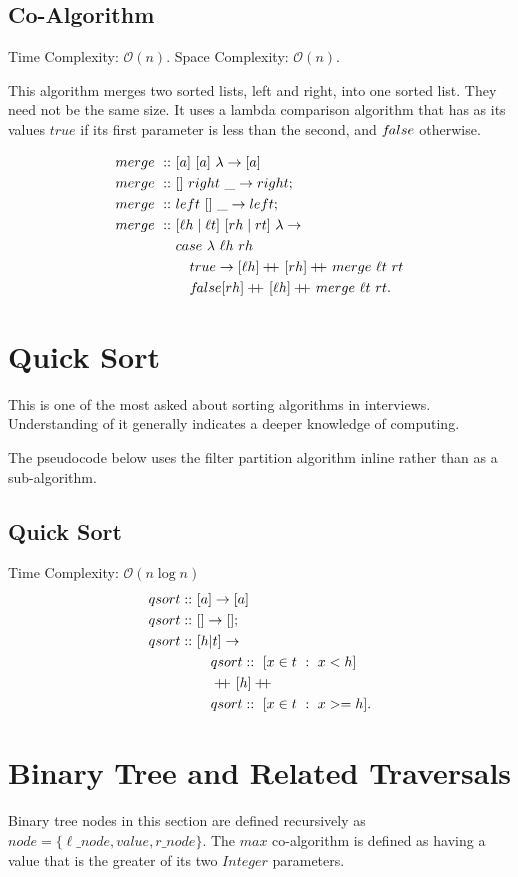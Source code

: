 \documentclass[a4paper,10pt]{book}
\newcommand\doubleplus{+\kern-1.3ex+\kern0.8ex}
\newcommand{\false}{f\kern-0.25ex{alse}}
\begin{document}
\subsection{Co-Algorithm} Time Complexity: $\mathcal{O}(n)$. Space Complexity: $\mathcal{O}(n)$.

This algorithm merges two sorted lists, left and right, into one sorted list. They need not be the same size. It uses a lambda comparison algorithm that has as its values $true$ if its first parameter is less than the second, and $\false$ otherwise.

\begin{align*}
merge\ ::\ &[a]\ [a]\ \lambda\rightarrow [a]\\
merge\ ::\ &[]\ right\ \_\rightarrow right;\\
merge\ ::\ &left\ []\ \_\rightarrow left;\\
merge\ ::\ &[\ell{h}\mid \ell{t}]\ [rh\mid rt]\ \lambda\rightarrow\\
	&case\ \lambda\ \ell{h}\ rh\\
	&\quad true\rightarrow [\ell{h}]\doubleplus [rh]\doubleplus merge\ \ell{t}\ rt\\
	&\quad\false [rh]\doubleplus [\ell{h}]\doubleplus merge\ \ell{t}\ rt.
\end{align*}
\section{Quick Sort}\label{quick_sort}
This is one of the most asked about sorting algorithms in interviews. Understanding of it generally indicates a deeper knowledge of computing.

The pseudocode below uses the filter partition algorithm inline rather than as a sub-algorithm.
\subsection{Quick Sort}
Time Complexity: $\mathcal{O}(n\log n)$
\begin{align*}
qsort ::\ &[a]\rightarrow[a]\\
qsort ::\ &[] \rightarrow [];\\
qsort ::\ &[h|t]\rightarrow\\
       &\quad qsort ::\ [x\in t\ :\ x < h]\\
       &\quad \doubleplus [h] \doubleplus\\
       &\quad qsort ::\ [x \in t\ :\ x >= h].
\end{align*}
\section{Binary Tree and Related Traversals}
Binary tree nodes in this section are defined recursively as $node = \{\ell\_node,value,r\_node\}$. The $max$ co-algorithm is defined as having a value that is the greater of its two $Integer$ parameters.
\end{document}
